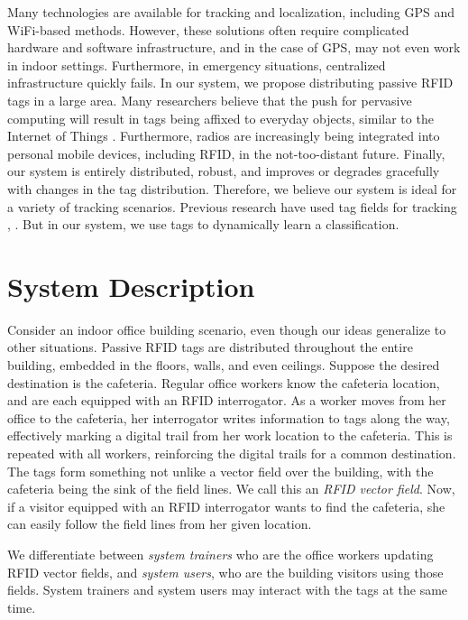 \documentclass[conference]{IEEEtran}
\begin{document}
Many technologies are available for tracking and localization, including GPS and WiFi-based methods. However, these solutions often require complicated hardware and software infrastructure, and in the case of GPS, may not even work in indoor settings. Furthermore, in emergency situations, centralized infrastructure quickly fails. In our system, we propose distributing passive RFID tags in a large area. Many researchers believe that the push for pervasive computing will result in tags being affixed to everyday objects, similar to the Internet of Things \cite{2011Uckelmann}. Furthermore, radios are increasingly being integrated into personal mobile devices, including RFID, in the not-too-distant future. Finally, our system is entirely distributed, robust, and improves or degrades gracefully with changes in the tag distribution. Therefore, we believe our system is ideal for a variety of tracking scenarios. Previous research have used tag fields for tracking \cite{2006Bohn}, \cite{2010Wu}. But in our system, we use tags to dynamically learn a classification.

\section{System Description}
\label{Section: System Description}
Consider an indoor office building scenario, even though our ideas generalize to other situations. Passive RFID tags are distributed throughout the entire building, embedded in the floors, walls, and even ceilings. Suppose the desired destination is the cafeteria. Regular office workers know the cafeteria location, and are each equipped with an RFID interrogator. As a worker moves from her office to the cafeteria, her interrogator writes information to tags along the way, effectively marking a digital trail from her work location to the cafeteria. This is repeated with all workers, reinforcing the digital trails for a common destination. The tags form something not unlike a vector field over the building, with the cafeteria being the sink of the field lines. We call this an \emph{RFID vector field}. Now, if a visitor equipped with an RFID interrogator wants to find the cafeteria, she can easily follow the field lines from her given location. 

We differentiate between \emph{system trainers} who are the office workers updating RFID vector fields, and \emph{system users}, who are the building visitors using those fields. System trainers and system users may interact with the tags at the same time.
\end{document}
